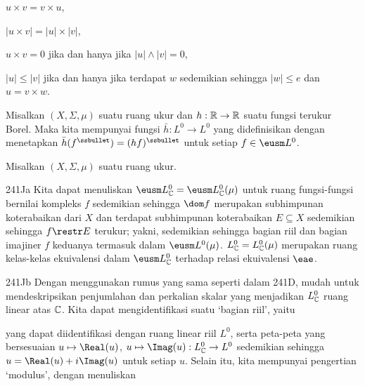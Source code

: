 \qquad $u\times v=v\times u$,

\qquad $|u\times v|=|u|\times |v|$,

\qquad $u\times v=0$ jika dan hanya jika $|u|\wedge|v|=0$,

\qquad $|u|\le|v|$ jika dan hanya jika terdapat $w$ sedemikian sehingga
$|w|\le e$ dan $u=v\times w$.

 Misalkan
$(X,\Sigma,\mu)$ suatu ruang ukur dan $h:\Bbb R\to\Bbb R$ suatu fungsi
terukur Borel. Maka kita mempunyai fungsi $\bar h:L^0\to L^0$ yang
didefinisikan dengan menetapkan
$\bar h(f^{\ssbullet})=(hf)^{\ssbullet}$ untuk setiap
$f\in\eusm L^0$. 



Misalkan $(X,\Sigma,\mu)$ suatu ruang ukur.

\spheader 241Ja Kita dapat menuliskan
$\eusm L^0_{\Bbb C}=\eusm L^0_{\Bbb C}(\mu)$ untuk ruang fungsi-fungsi
bernilai kompleks $f$ sedemikian sehingga $\dom f$ merupakan subhimpunan
koterabaikan dari $X$ dan terdapat subhimpunan koterabaikan
$E\subseteq X$ sedemikian sehingga $f\restr E$ terukur; yakni,
sedemikian sehingga bagian riil dan bagian imajiner $f$ keduanya termasuk
dalam $\eusm L^0(\mu)$. 
$L^0_{\Bbb C}=L^0_{\Bbb C}(\mu)$ merupakan ruang kelas-kelas
ekuivalensi dalam $\eusm L^0_{\Bbb C}$ terhadap relasi ekuivalensi
$\eae$.

\spheader 241Jb Dengan menggunakan rumus yang sama seperti dalam 241D,
mudah untuk mendeskripsikan penjumlahan dan perkalian skalar yang menjadikan
$L^0_{\Bbb C}$ ruang linear atas $\Bbb C$. Kita dapat
mengidentifikasi suatu `bagian riil', yaitu


\noindent yang dapat diidentifikasi dengan ruang linear
riil $L^0$, serta peta-peta yang bersesuaian
$u\mapsto\Real(u)$, $u\mapsto\Imag(u):L^0_{\Bbb C}\to L^0$ sedemikian
sehingga $u=\Real(u)+i\Imag(u)$ untuk setiap $u$. Selain itu, kita
mempunyai pengertian `modulus', dengan menuliskan

